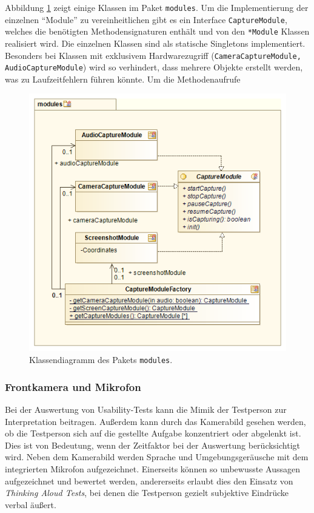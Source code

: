 Abbildung \ref{pic:modules_class_diagram} zeigt einige Klassen im Paket \texttt{modules}.
Um die Implementierung der einzelnen \enquote{Module} zu vereinheitlichen gibt es ein Interface \texttt{CaptureModule}, welches die benötigten Methodensignaturen enthält und von den \texttt{*Module} Klassen realisiert wird.
Die einzelnen Klassen sind als statische Singletons \cite[vgl.][21\psq]{designpattern} implementiert.
Besonders bei Klassen mit exklusivem Hardwarezugriff (\texttt{CameraCaptureModule, AudioCaptureModule}) wird so verhindert, dass mehrere Objekte erstellt werden, was zu Laufzeitfehlern führen könnte.
Um die Methodenaufrufe 
\begin{figure}
\includegraphics[width=\linewidth]{img/modules_Class_diagram}
\caption{Klassendiagramm des Pakets \mbox{\texttt{modules}}.}
\label{pic:modules_class_diagram}
\end{figure}


\subsubsection{Frontkamera und Mikrofon}
Bei der Auswertung von Usability-Tests kann die Mimik der Testperson zur Interpretation beitragen.
Außerdem kann durch das Kamerabild gesehen werden, ob die Testperson sich auf die gestellte Aufgabe konzentriert oder abgelenkt ist.
Dies ist von Bedeutung, wenn der Zeitfaktor bei der Auswertung berücksichtigt wird.
Neben dem Kamerabild werden Sprache und Umgebungsgeräusche mit dem integrierten Mikrofon aufgezeichnet.
Einerseits können so unbewusste Aussagen aufgezeichnet und bewertet werden, andererseits erlaubt dies den Einsatz von \emph{Thinking Aloud Tests}, bei denen die Testperson gezielt subjektive Eindrücke verbal äußert.  %

